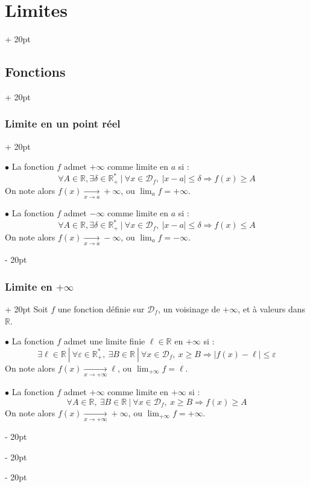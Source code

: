\documentclass[a4paper, 12pt, twoside]{article}
\newcommand{\R}{\mathbb{R}} %
\newcommand{\tendsto}[1]{\xrightarrow[#1]{}}
\newcommand{\abs}[1]{\left\lvert #1 \right\rvert}
\renewcommand{\le}{\leqslant}
\renewcommand{\ge}{\geqslant}
\newcommand{\ep}{\varepsilon}
\newcommand{\ind}[1][20pt]{\advance\leftskip + #1}
\newcommand{\deind}[1][20pt]{\advance\leftskip - #1}
\newenvironment{indt}[2][20pt]{#2 \par \ind[#1]}{\par \deind} %
\begin{document}
\begin{indt}{\section{Limites}}
\begin{indt}{\subsection{Fonctions}}
\begin{indt}{\subsubsection{Limite en un point réel}}
                \vspace{6pt}
                
                $\bullet$ La fonction $f$ admet $+\infty$ comme limite en $a$ si :
                \[
                    \forall A \in \R, \exists \delta \in \R_+^*\ |\ \forall x \in \mathcal D_f,\ \abs{x - a} \le \delta \Rightarrow f(x) \ge A
                \]
                On note alors $f(x) \tendsto{x \to a} +\infty$, ou $\displaystyle \lim_a f = +\infty$.

                \vspace{6pt}
                
                $\bullet$ La fonction $f$ admet $-\infty$ comme limite en $a$ si :
                \[
                    \forall A \in \R, \exists \delta \in \R_+^*\ |\ \forall x \in \mathcal D_f,\ \abs{x - a} \le \delta \Rightarrow f(x) \le A
                \]
                On note alors $f(x) \tendsto{x \to a} -\infty$, ou $\displaystyle \lim_a f = -\infty$.
            \end{indt}

            \vspace{12pt}
            
            \begin{indt}{\subsubsection{Limite en $+\infty$}}
                Soit $f$ une fonction définie sur $\mathcal D_f$, un voisinage de $+\infty$, et à valeurs dans $\R$.

                \vspace{6pt}
                
                $\bullet$ La fonction $f$ admet une limite finie $\ell \in \R$ en $+\infty$ si :
                \[
                    \exists \ell \in \R\ |\ \forall \ep \in \R_+^*,\ \exists B \in \R\ |\ \forall x \in \mathcal D_f,\ x \ge B \Rightarrow \abs{f(x) - \ell} \le \ep
                \]
                On note alors $f(x) \tendsto{x \to +\infty} \ell$, ou $\displaystyle \lim_{+\infty} f = \ell$.

                \vspace{6pt}
                
                $\bullet$ La fonction $f$ admet $+\infty$ comme limite en $+\infty$ si :
                \[
                    \forall A \in \R,\ \exists B \in \R\ |\ \forall x \in \mathcal D_f,\ x \ge B \Rightarrow f(x) \ge A
                \]
                On note alors $f(x) \tendsto{x \to +\infty} +\infty$, ou $\displaystyle \lim_{+\infty} f = +\infty$.


\end{indt}
\end{indt}
\end{indt}
\end{document}
